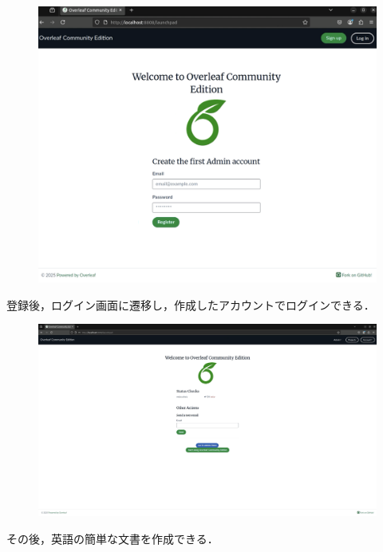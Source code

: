 \begin{figure}[H]
    \centering
    \includegraphics[width=0.8\linewidth]{images/Pasted image 20250307160444.png}
\end{figure}

登録後，ログイン画面に遷移し，作成したアカウントでログインできる．

\begin{figure}[H]
    \centering
    \includegraphics[width=0.8\linewidth]{images/Pasted image 20250307160656.png}
\end{figure}

その後，英語の簡単な文書を作成できる．


